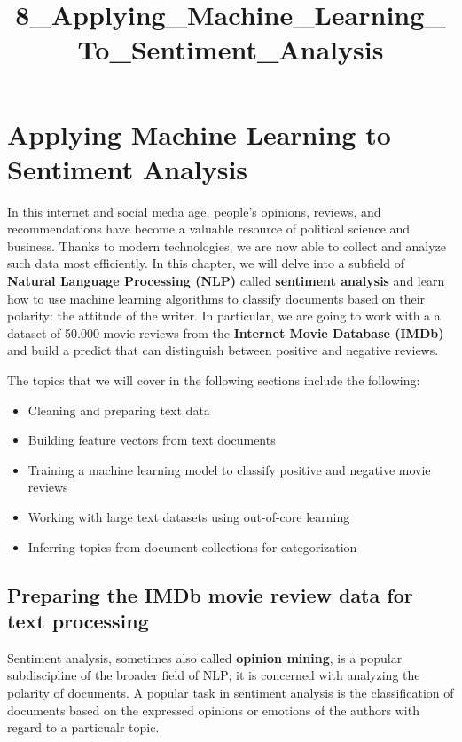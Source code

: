 \documentclass[11pt]{article}
\title{8\_Applying\_Machine\_Learning\_To\_Sentiment\_Analysis}
\providecommand{\tightlist}{%
      \setlength{\itemsep}{0pt}\setlength{\parskip}{0pt}}
\begin{document}
    
    
    \maketitle
    
    

    
    \section{Applying Machine Learning to Sentiment
Analysis}\label{applying-machine-learning-to-sentiment-analysis}

    In this internet and social media age, people's opinions, reviews, and
recommendations have become a valuable resource of political science and
business. Thanks to modern technologies, we are now able to collect and
analyze such data most efficiently. In this chapter, we will delve into
a subfield of \textbf{Natural Language Processing (NLP)} called
\textbf{sentiment analysis} and learn how to use machine learning
algorithms to classify documents based on their polarity: the attitude
of the writer. In particular, we are going to work with a a dataset of
50.000 movie reviews from the \textbf{Internet Movie Database (IMDb)}
and build a predict that can distinguish between positive and negative
reviews.

The topics that we will cover in the following sections include the
following:

\begin{itemize}
\tightlist
\item
  Cleaning and preparing text data
\item
  Building feature vectors from text documents
\item
  Training a machine learning model to classify positive and negative
  movie reviews
\item
  Working with large text datasets using out-of-core learning
\item
  Inferring topics from document collections for categorization
\end{itemize}

    \subsection{Preparing the IMDb movie review data for text
processing}\label{preparing-the-imdb-movie-review-data-for-text-processing}

    Sentiment analysis, sometimes also called \textbf{opinion mining}, is a
popular subdiscipline of the broader field of NLP; it is concerned with
analyzing the polarity of documents. A popular task in sentiment
analysis is the classification of documents based on the expressed
opinions or emotions of the authors with regard to a particualr topic.
\end{document}
